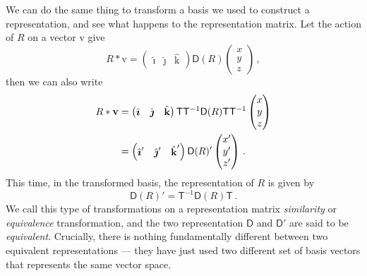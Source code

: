 \documentclass{article}
\theoremstyle{plain}\theoremheaderfont{\normalfont\itshape}\theorembodyfont{\rmfamily}\theoremseparator{.}\newtheorem*{rem}{Remark}\newtheorem*{ex}{Example}\newtheorem*{proof}{Proof}\newtheorem*{altp}{Alternative proof}
\theoremstyle{plain}\theoremheaderfont{\normalfont\bfseries}\theorembodyfont{\rmfamily}\theoremseparator{.}\newtheorem{thm}{Theorem}[section]\newtheorem{lem}[thm]{Lemma}\newtheorem{prop}[thm]{Proposition}\newtheorem*{cor}{Corollary}\newtheorem{defn}[thm]{Definition}\newtheorem{clm}[thm]{Claim}\newtheorem{clminproof}{Claim}\newtheorem*{law}{Law}\newtheorem{pos}[thm]{Postulate}
\theoremstyle{break}\theoremheaderfont{\normalfont\itshape}\theorembodyfont{\rmfamily}\theoremseparator{.\medskip}\newtheorem*{proofskip}{Proof}\newtheorem*{exs}{Examples}\newtheorem*{rems}{Remarks}
\theoremstyle{break}\theoremheaderfont{\normalfont\bfseries}\theorembodyfont{\rmfamily}\theoremseparator{.\medskip}\newtheorem{lemskip}[thm]{Lemma}\newtheorem{defnskip}[thm]{Definition}\newtheorem{propskip}[thm]{Proposition}\newtheorem{thmskip}[thm]{Theorem}
\numberwithin{equation}{section}
\newcommand{\vb}[1]{\bm{\mathrm{#1}}}
\newcommand{\vu}[1]{\hat{\bm{\mathrm{#1}}}}
\newcommand{\DD}{\mathsf{D}}
\newcommand{\TT}{\mathsf{T}}
\begin{document}
    We can do the same thing to transform a basis we used to construct a representation, and see what happens to the representation matrix. Let the action of \(R\) on a vector \(\vb{v}\) give
    \begin{equation}
        R*\vb{v}=\begin{pmatrix}
            \vu{\imath} & \vu{\jmath} & \vu{k}
        \end{pmatrix}\DD(R)\begin{pmatrix}
            x \\ y \\ z
        \end{pmatrix}\,,
    \end{equation}
    then we can also write
    \begin{align}
        R*\vb{v}&=\begin{pmatrix}
            \vu{\imath} & \vu{\jmath} & \vu{k}
        \end{pmatrix}\TT\TT^{-1}\DD(R)\TT\TT^{-1}\begin{pmatrix}
            x \\ y \\ z
        \end{pmatrix}\notag \\
        &=\begin{pmatrix}
            \vu{\imath}' & \vu{\jmath}' & \vu{k}'
        \end{pmatrix}\DD(R)'\begin{pmatrix}
            x' \\ y' \\ z'
        \end{pmatrix}\,.
    \end{align}
    This time, in the transformed basis, the representation of \(R\) is given by
    \begin{equation}
        \DD(R)'=\TT^{-1}\DD(R)\TT\,.
    \end{equation}
    We call this type of transformations on a representation matrix \textit{similarity} or \textit{equivalence} transformation, and the two representation \(\DD\) and \(\DD'\) are said to be \textit{equivalent}. Crucially, there is nothing fundamentally different between two equivalent representations --- they have just used two different set of basis vectors that represents the same vector space.
\end{document}
